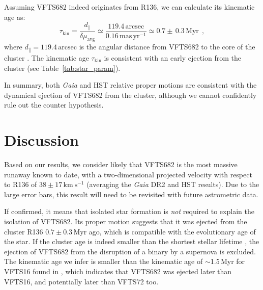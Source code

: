 \documentclass[a4paper,fleqn,usenatbib]{mnras}
\newcommand{\kms}{{\,\mathrm{km\ s^{-1}}}}
\newcommand{\masyr}{\,\mathrm{mas}\,\mathrm{yr}^{-1}}
\DeclareRobustCommand{\Tabref}[1]{Table~\ref{#1}}
\begin{document}
Assuming VFTS682 indeed originates from R136, we can calculate its kinematic
age as:
\begin{equation}
  \label{eq:kin_age}
  \tau_\mathrm{kin} = \frac{d_\parallel}{\delta\mu_\mathrm{avg}} \simeq
  \frac{119.4\,\mathrm{arcsec}}{0.16\masyr} \simeq 0.7\pm\,0.3\, \mathrm{Myr} \ \ ,
\end{equation}
where $d_\parallel = 119.4\,\mathrm{arcsec}$ is the angular distance from VFTS682 to
the core of the cluster \citep[][]{bestenlehner:11}. %
The kinematic age $\tau_\mathrm{kin}$ is consistent with an early
ejection from the cluster (see \Tabref{tab:star_param}).

In summary, both \emph{Gaia} and HST relative proper motions are consistent with the dynamical ejection of
VFTS682 from the cluster, although we cannot confidently rule out the
counter hypothesis. 
\vspace*{-20pt}
\section{Discussion}
\label{sec:discussion}

Based on our results, we consider likely that VFTS682 is the most massive
runaway known to date, with a two-dimensional
projected velocity with respect to R136 of
$38\pm17\kms$ (averaging the \emph{Gaia} DR2 and HST
results). Due to the large error bars, this result will need
to be revisited with future astrometric data. %

If confirmed, it means that isolated star formation is
\emph{not} required to explain the isolation of VFTS682. Its proper motion suggests that it was ejected from the cluster R136
$0.7\pm0.3$\,Myr ago, which is compatible with the evolutionary age of
the star. If the
cluster age \citep[$\lesssim2$\,Myr,][]{crowther:10, sabbi:12} is
indeed smaller than the shortest stellar lifetime
\citep[$\sim$3\,Myr,][]{brott:11,kohler:15, zapartas:17}, the ejection of VFTS682
from the disruption of a binary by a supernova is excluded. %
The kinematic age we infer is smaller than the kinematic age of
$\sim$1.5\,Myr for VFTS16 found in \cite{lennon:18}, which indicates
that VFTS682 was ejected later than VFTS16, and potentially later than
VFTS72 too.
\end{document}
